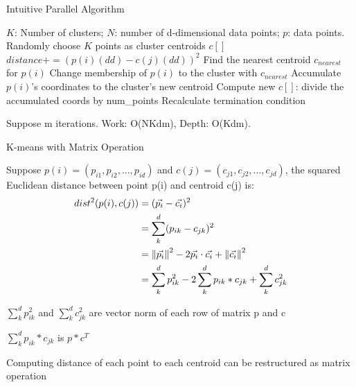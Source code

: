 \documentclass[
nopagebreaks,
style=klope,
fleqn]{powerdot}
\begin{document}
\begin{slide} {Intuitive Parallel Algorithm}
  \footnotesize
  \begin{algorithmic}[1]
    \INPUT $K$: Number of clusters; $N$: number of d-dimensional data points; $p$: data points.
     \label{alg:p}
    \State Randomly choose $K$ points as cluster centroids $c[]$
    \State $distance += (p(i)(dd) - c(j)(dd))^2$
    \EndFor
    \EndFor
    \State Find the nearest centroid $c_{nearest}$ for $p(i)$
    \State Change membership of $p(i)$ to the cluster with $c_{nearest}$
    \State Accumulate $p(i)$'s coordinates to the cluster's new centroid
    \EndParFor
    \State Compute new $c[]$: divide the accumulated coords by num\_points
    \State Recalculate termination condition
    \EndWhile
    \EndFunction  
  \end{algorithmic}
  \begin{compactitem}
    \vspace{5mm}
  \item{Suppose m iterations. 
    Work: O(NKdm), Depth: O(Kdm).}
  \end{compactitem}
\end{slide}

\begin{slide}{K-means with Matrix Operation}
  \footnotesize
  \begin{compactitem}
  \item{Suppose $p(i) = (p_{i1}, p_{i2}, ..., p_{id})$ and $c(j) = (c_{j1},
    c_{j2}, ..., c_{jd})$, the squared Euclidean distance between point p(i) and centroid c(j) is: 
    \begin{align}
      dist^2(p(i),c(j)) &= (\vec{p_i} - \vec{c_i})^2 \\
                 &= \sum\limits_{k}^d (p_{ik} - c_{jk})^2  \label{e1}\\
             &= \left\lVert\vec{p_i}\right\rVert^2 - 2 \vec{p_i} \cdot \vec{c_i} + \left\lVert\vec{c_i}\right\rVert^2  \nonumber\\
             &= \sum\limits_{k}^d p_{ik}^2 - 2 \sum\limits_{k}^d p_{ik}*c_{jk} + \sum\limits_{k}^d c_{jk}^2 \label{e2}
  \end{align}}
  \item{
    $\sum\limits_{k}^d p_{ik}^2$ and $\sum\limits_{k}^d c_{jk}^2$ are vector norm of each row of matrix p and c
  }
  \item{
    $\sum\limits_{k}^d p_{ik}*c_{jk}$ is $p * c^T$
  }
  \item{Computing distance of each point to each centroid can be restructured as matrix operation}
  \end{compactitem}
\end{slide}
\end{document}
